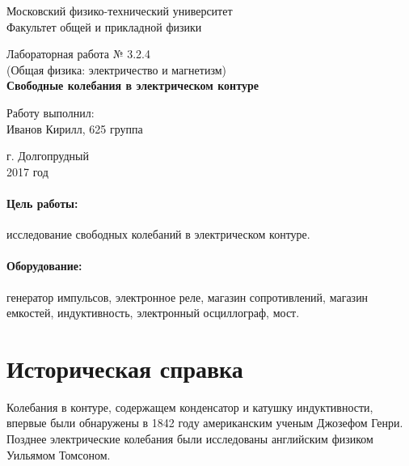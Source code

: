 \documentclass[12pt]{kiarticle} %
\begin{document}
\begin{titlepage}
	\begin{center}
		\large 	Московский физико-технический университет \\
		Факультет общей и прикладной физики \\
		\vspace{0.2cm}
		
		\vspace{4.5cm}
		Лабораторная работа № 3.2.4 \\ \vspace{0.2cm}
		\large (Общая физика: электричество и магнетизм) \\ \vspace{0.2cm}
		\LARGE \textbf{Свободные колебания в электрическом контуре}
	\end{center}
	\vspace{2.3cm} \large
	
	\begin{center}
		Работу выполнил: \\
		Иванов Кирилл,
		625 группа
		\vspace{10mm}
		
	
		
		
	\end{center}
	
	\begin{center} \vspace{60mm}
		г. Долгопрудный \\
		 2017 год
	\end{center}
\end{titlepage}




\paragraph*{Цель работы:} исследование свободных колебаний в электрическом контуре.

\paragraph*{Оборудование:} генератор импульсов, электронное реле, магазин сопротивлений, магазин емкостей, индуктивность, электронный осциллограф, мост.


\section{Историческая справка}

Колебания в контуре, содержащем конденсатор и катушку индуктивности, впервые были обнаружены в 1842 году американским ученым Джозефом Генри. Позднее электрические колебания были исследованы английским физиком Уильямом Томсоном. 
\end{document}
